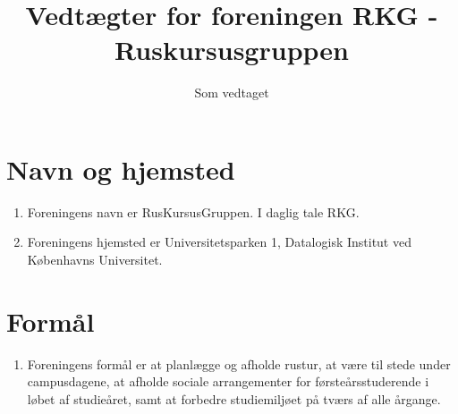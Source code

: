 \documentclass[a4paper, 10pt]{article}
\title{Vedtægter for foreningen RKG - Ruskursusgruppen}
\author{}
\date{Som vedtaget \vedtagsdato{}}
\newenvironment{stykenum}{
  \begin{enumerate}[%
    label=Stk.~\arabic*:, ref=\textsection~\theenumi~Stk.~\arabic*, start=1]
}{\end{enumerate}}
\begin{document}
\maketitle
\thispagestyle{first}

\section{Navn og hjemsted}
\begin{stykenum}
    \item \label{navn} Foreningens navn er RusKursusGruppen. I daglig tale RKG.

    \item \label{hjemsted} Foreningens hjemsted er Universitetsparken 1,
        Datalogisk Institut ved Københavns Universitet.

\end{stykenum}

\section{Formål}
\begin{stykenum}
\item \label{formaal} Foreningens formål er at planlægge og afholde  rustur, at
    være til stede under campusdagene, at afholde sociale arrangementer for
    førsteårsstuderende i løbet af studieåret,  samt at forbedre studiemiljøet
    på tværs af alle årgange.
\end{stykenum}
\end{document}
